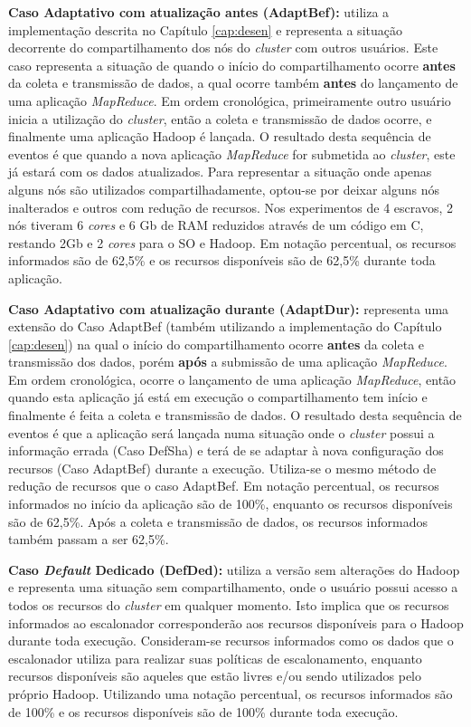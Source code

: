 \textbf{Caso Adaptativo com atualização antes (AdaptBef):} utiliza a implementação descrita no Capítulo \ref{cap:desen} e representa a situação decorrente do compartilhamento dos nós do \textit{cluster} com outros usuários. Este caso representa a situação de quando o início do compartilhamento ocorre \textbf{antes} da coleta e transmissão de dados, a qual ocorre também \textbf{antes} do lançamento de uma aplicação \textit{MapReduce}. Em ordem cronológica, primeiramente outro usuário inicia a utilização do \textit{cluster}, então a coleta e transmissão de dados ocorre, e finalmente uma aplicação Hadoop é lançada. O resultado desta sequência de eventos é que quando a nova aplicação \textit{MapReduce} for submetida ao \textit{cluster}, este já estará com os dados atualizados. Para representar a situação onde apenas alguns nós são utilizados compartilhadamente, optou-se por deixar alguns nós inalterados e outros com redução de recursos. Nos experimentos de 4 escravos, 2 nós tiveram 6 \textit{cores} e 6 Gb de RAM reduzidos através de um código em C, restando 2Gb e 2 \textit{cores} para o SO e Hadoop. Em notação percentual, os recursos informados são de 62,5\% e os recursos disponíveis são de 62,5\% durante toda aplicação.

\textbf{Caso Adaptativo com atualização durante (AdaptDur):} representa uma extensão do Caso AdaptBef (também utilizando a implementação do Capítulo \ref{cap:desen}) na qual o início do compartilhamento ocorre \textbf{antes} da coleta e transmissão dos dados, porém \textbf{após} a submissão de uma aplicação \textit{MapReduce}. Em ordem cronológica, ocorre o lançamento de uma aplicação \textit{MapReduce}, então quando esta aplicação já está em execução o compartilhamento tem início e finalmente é feita a coleta e transmissão de dados. O resultado desta sequência de eventos é que a aplicação será lançada numa situação onde o \textit{cluster} possui a informação errada (Caso DefSha) e terá de se adaptar à nova configuração dos recursos (Caso AdaptBef) durante a execução. Utiliza-se o mesmo método de redução de recursos que o caso AdaptBef. Em notação percentual, os recursos informados no início da aplicação são de 100\%, enquanto os recursos disponíveis são de 62,5\%. Após a coleta e transmissão de dados, os recursos informados também passam a ser 62,5\%.

\textbf{Caso \textit{Default} Dedicado (DefDed):} utiliza a versão sem alterações do Hadoop e representa uma situação sem compartilhamento, onde o usuário possui acesso a todos os recursos do \textit{cluster} em qualquer momento. Isto implica que os recursos informados ao escalonador corresponderão aos recursos disponíveis para o Hadoop durante toda execução. Consideram-se recursos informados como os dados que o escalonador utiliza para realizar suas políticas de escalonamento, enquanto recursos disponíveis são aqueles que estão livres e/ou sendo utilizados pelo próprio Hadoop. Utilizando uma notação percentual, os recursos informados são de 100\% e os recursos disponíveis são de 100\% durante toda execução.

